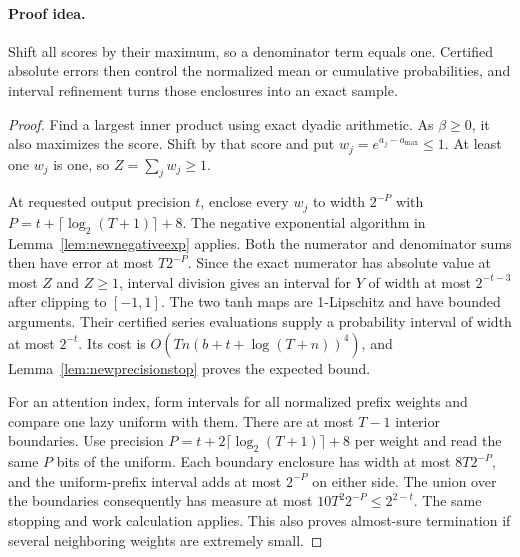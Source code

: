 \paragraph{Proof idea.}
Shift all scores by their maximum, so a denominator term equals one.  Certified absolute errors then control the normalized mean or cumulative probabilities, and interval refinement turns those enclosures into an exact sample.

\begin{proof}
Find a largest inner product using exact dyadic arithmetic.
As $\beta\ge0$, it also maximizes the score. Shift by that score
and put $w_j=e^{a_j-a_{\max}}\le1$. At least one $w_j$ is one,
so $Z=\sum_jw_j\ge1$.

At requested output precision $t$, enclose every $w_j$ to width
$2^{-P}$ with $P=t+\lceil\log_2(T+1)\rceil+8$. The negative
exponential algorithm in Lemma~\ref{lem:newnegativeexp} applies.
Both the numerator and denominator sums then have error at most
$T2^{-P}$. Since the exact numerator has absolute value at most
$Z$ and $Z\ge1$, interval division gives an interval for $Y$ of
width at most $2^{-t-3}$ after clipping to $[-1,1]$.
The two tanh maps are 1-Lipschitz and have bounded arguments.
Their certified series evaluations supply a probability interval
of width at most $2^{-t}$. Its cost is
$O(Tn(b+t+\log(T+n))^4)$, and
Lemma~\ref{lem:newprecisionstop} proves the expected bound.

For an attention index, form intervals for all normalized prefix
weights and compare one lazy uniform with them. There are at most
$T-1$ interior boundaries. Use precision
$P=t+2\lceil\log_2(T+1)\rceil+8$ per weight and read the same
$P$ bits of the uniform. Each boundary enclosure has width at most
$8T2^{-P}$, and the uniform-prefix interval adds at most $2^{-P}$
on either side. The union over the boundaries consequently has
measure at most $10T^2 2^{-P}\le2^{2-t}$. The same stopping
and work calculation applies. This also proves almost-sure
termination if several neighboring weights are extremely small.
\end{proof}

